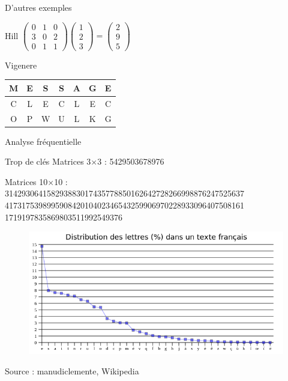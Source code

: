 \documentclass{beamer}
\begin{document}
\begin{frame}{D'autres exemples}
  \begin{block}{Hill}
\centering
    $\begin{pmatrix}
0 & 1 & 0\\
3 & 0 & 2\\
0 & 1 & 1
\end{pmatrix}
\begin{pmatrix}
1\\
2\\
3
\end{pmatrix}
=
\begin{pmatrix}
2\\
9\\
5
\end{pmatrix}$
\end{block}
  \begin{block}{Vigenere}
\centering
\begin{tabular}{ c c c c c c c }
M & E & S & S & A & G & E\\
\hline
C & L & E & C & L & E & C\\
\hline
O & P & W & U & L & K & G
\end{tabular}
\end{block}
  \end{frame}

\begin{frame}{Analyse fréquentielle}
  \begin{alertblock}{Trop de clés}
    Matrices 3$\times$3 : 5429503678976
    
    Matrices 10$\times$10 : \\
314293064158293883017435778850162642728266998876247525637
417317539899590842010402346543259906970228933096407508161
1719197835869803511992549376
    \end{alertblock}

\begin{figure}
\centering
\includegraphics[scale = 0.38]{distribution.png}
\end{figure}
\footnotesize{Source : manudiclemente, Wikipedia}
  \end{frame}
\end{document}
